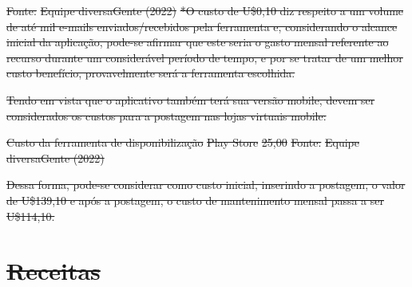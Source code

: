 \documentclass[
    12pt,               %
    openright,          %
    oneside,
    a4paper,            %
    paginasA3,  %
    BIBLATEX,           %
    REFINDENT,          %
    MODELO,             %
    TODO,               %
    english,            %
    brazil              %
    ]{ifsp-spo-inf-ctds} %
\providecommand{\DIFdel}[1]{{\protect\color{red}\sout{#1}}}                      %
\begin{document}
\begin{apendicesenv}
\DIFdel{Fonte:}%
\DIFdel{Equipe diversaGente (2022) }%
\DIFdel{*O custo de U\$0,10 diz respeito a um volume de até mil e-mails enviados/recebidos pela ferramenta e, considerando o alcance inicial da aplicação, pode-se afirmar que este seria o gasto mensal referente ao recurso durante um considerável período de tempo, e por se tratar de um melhor custo benefício, provavelmente será a ferramenta escolhida.
}%

\DIFdel{Tendo em vista que o aplicativo também terá sua versão mobile, devem ser considerados os custos para a postagem nas lojas virtuais mobile: 
}%

{%
\DIFdel{Custo da ferramenta de disponibilização}}
\DIFdel{Play Store }%
\DIFdel{25,00 }%
\DIFdel{Fonte:}%
\DIFdel{Equipe diversaGente (2022) }%

\DIFdel{Dessa forma, pode-se considerar como custo inicial, inserindo a postagem, o valor de U\$139,10 e após a postagem, o custo de mantenimento mensal passa a ser U\$114,10.
}%

\section{\DIFdel{Receitas}}
\addtocounter{section}{-1}%


\end{apendicesenv}
\end{document}
